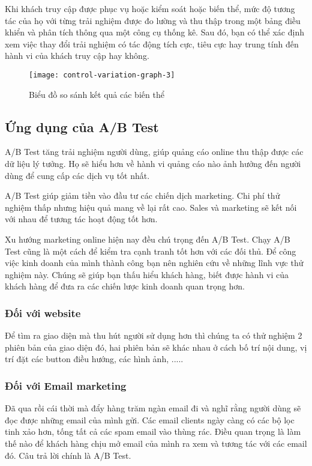 Khi khách truy cập được phục vụ hoặc kiểm soát hoặc biến thể, mức độ tương tác của họ với từng trải nghiệm được đo lường và thu thập trong một bảng điều khiển và phân tích thông qua một công cụ thống kê. Sau đó, bạn có thể xác định xem việc thay đổi trải nghiệm có tác động tích cực, tiêu cực hay trung tính đến hành vi của khách truy cập hay không.

\begin{figure}[ht]
	\centering
	\texttt{[image: control-variation-graph-3]}
	\caption{Biểu đồ so sánh kết quả các biến thể}
\end{figure}

\subsection{Ứng dụng của A/B Test}

A/B Test tăng trải nghiệm người dùng, giúp quảng cáo online thu thập được các dữ liệu lý tưởng. Họ sẽ hiểu hơn về hành vi quảng cáo nào ảnh hưởng đến người dùng để cung cấp các dịch vụ tốt nhất.

A/B Test giúp giảm tiền vào đầu tư các chiến dịch marketing. Chi phí thử nghiệm thấp nhưng hiệu quả mang về lại rất cao. Sales và marketing sẽ kết nối với nhau để tương tác hoạt động tốt hơn.

Xu hướng marketing online hiện nay đều chú trọng đến A/B Test. Chạy A/B Test cũng là một cách để kiểm tra cạnh tranh tốt hơn với các đối thủ. Để công việc kinh doanh của mình thành công bạn nên nghiên cứu về những lĩnh vực thử nghiệm này. Chúng sẽ giúp bạn thấu hiểu khách hàng, biết được hành vi của khách hàng để đưa ra các chiến lược kinh doanh quan trọng hơn.

\subsubsection{Đối với website}

Để tìm ra giao diện mà thu hút người sử dụng hơn thì chúng ta có thử nghiệm 2 phiên bản của giao diện đó, hai phiên bản sẽ khác nhau ở cách bố trí nội dung, vị trí đặt các button điều hướng, các hình ảnh, .....

\subsubsection{Đối với Email marketing}

Đã qua rồi cái thời mà đẩy hàng trăm ngàn email đi và nghĩ rằng người dùng sẽ đọc được những email của mình gửi. Các email clients ngày càng có các bộ lọc tinh xảo hơn, tống tất cả các spam email vào thùng rác. Điều quan trọng là làm thế nào để khách hàng chịu mở email của mình ra xem và tương tác với các email đó. Câu trả lời chính là A/B Test.

